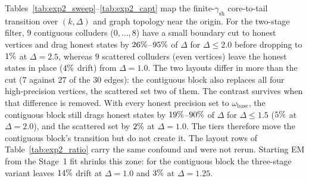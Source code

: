 \documentclass[11pt,a4paper]{article}
\theoremstyle{definition}
\theoremstyle{remark}
\begin{document}
Tables~\ref{tab:exp2_sweep}--\ref{tab:exp2_capt} map the finite-$\gamma_{\mathrm{sh}}$ core-to-tail transition over $(k, \Delta)$ and graph topology near the origin. For the two-stage filter, $9$ contiguous colluders ($0,\dots,8$) have a small boundary cut to honest vertices and drag honest states by $26\%$--$95\%$ of $\Delta$ for $\Delta \le 2.0$ before dropping to $1\%$ at $\Delta = 2.5$, whereas $9$ scattered colluders (even vertices) leave the honest states in place ($4\%$ drift) from $\Delta = 1.0$. The two layouts differ in more than the cut ($7$ against $27$ of the $30$ edges): the contiguous block also replaces all four high-precision vertices, the scattered set two of them. The contrast survives when that difference is removed. With every honest precision set to $\omega_{\mathrm{base}}$, the contiguous block still drags honest states by $19\%$--$90\%$ of $\Delta$ for $\Delta \le 1.5$ ($5\%$ at $\Delta = 2.0$), and the scattered set by $2\%$ at $\Delta = 1.0$. The tiers therefore move the contiguous block's transition but do not create it. The layout rows of Table~\ref{tab:exp2_ratio} carry the same confound and were not rerun. Starting EM from the Stage~1 fit shrinks this zone: for the contiguous block the three-stage variant leaves $14\%$ drift at $\Delta = 1.0$ and $3\%$ at $\Delta = 1.25$.
\end{document}
